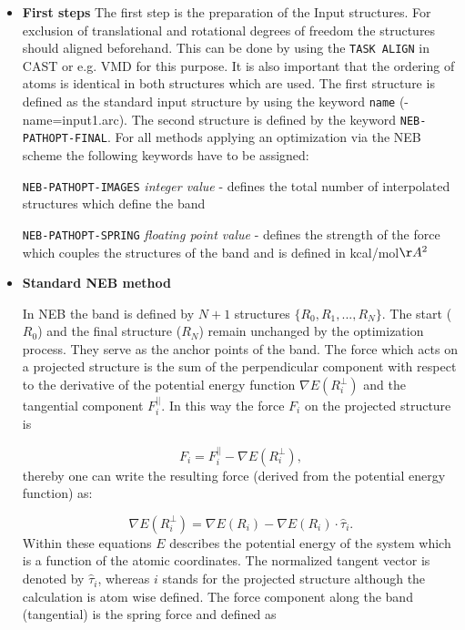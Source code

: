 \documentclass[10pt,a4paper]{article} %
\begin{document}
\begin{itemize}
	\item 
	\textbf{First steps}\newline
	The first step is the preparation of the Input structures. For exclusion of translational and rotational
	degrees of freedom the structures should aligned beforehand. This can be done by using the \texttt{TASK ALIGN} in CAST or e.g. VMD for this purpose. It is also important that the ordering of atoms is identical in both structures which are used.
	The first structure is defined as the standard input structure by using  the keyword \texttt{name} (-name=input1.arc). The second structure is defined by the keyword \texttt{NEB-PATHOPT-FINAL}. For all methods applying an optimization via the NEB scheme the
	following keywords have to be assigned:
	
	\texttt{NEB-PATHOPT-IMAGES} \textit{integer value} - defines the total number of interpolated structures which define the band\newline
	
	\texttt{NEB-PATHOPT-SPRING} \textit{floating point value} - defines the strength of the force which couples the structures of the band and is defined in kcal/mol$\AA^{2}$  \newline
		
	
	\item \textbf{Standard NEB method}
	
	In NEB the band is defined by $N+1$ structures $\{ R_{0},R_{1},...,R_{N} \}$. The start ($R_{0}$) and the final structure ($R_{N}$) remain unchanged by the optimization process. They serve as the anchor points of the band. The force which acts on a projected structure is the sum of the perpendicular component with respect to the derivative of the potential energy function $\nabla E(R^{\bot}_{i})$ and the tangential component $F^{||}_{i}$. In this way the force $F_{i}$ on the projected structure is
	
	\begin{equation}
	F_{i}=F^{||}_{i}-\nabla E(R^{\bot}_{i}),
	\end{equation}
	thereby one can write the resulting force (derived from the potential energy function) as:
	
	\begin{equation}
	\nabla E(R^{\bot}_{i})=\nabla E(R_{i}) -\nabla E(R_{i})\cdot \hat{\tau}_{i}.
	\end{equation}
	Within these equations $E$ describes the potential energy of the system which is a function of the atomic coordinates. The normalized tangent vector is denoted by $\hat{\tau}_{i}$, whereas $i$ stands for the projected structure although the calculation is atom wise defined. The force component along the band (tangential) is the spring force and defined as
	

\end{itemize}
\end{document}
